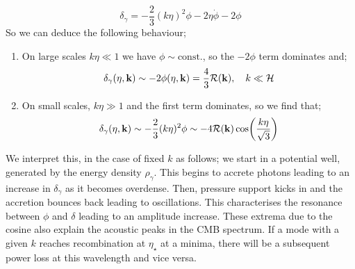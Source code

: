 \begin{equation*}
\delta_\gamma = -\frac{2}{3}(k\eta)^2 \phi - 2\eta \dot{\phi} - 2\phi
\end{equation*}
So we can deduce the following behaviour;
\begin{enumerate}
\item On large scales $k\eta \ll 1$ we have $\phi \sim \text{const.}$, so the $-2\phi$ term dominates and;
\begin{equation}
\delta_{\gamma}(\eta, \mathbf{k}) \sim -2\phi(\eta, \mathbf{k}) = \frac{4}{3}\mathcal{R}(\mathbf{k}), \quad k \ll \mathcal{H}
\end{equation}
\item On small scales, $k\eta \gg 1$ and the first term dominates, so we find that;
\begin{equation}
\delta_{\gamma}(\eta, \vec{k}) \sim -\frac{2}{3}(k\eta)^2 \phi \sim -4\mR(\vec{k})\cos\left(\frac{k\eta}{\sqrt{3}}\right)
\end{equation}
\end{enumerate}
We interpret this, in the case of fixed $k$ as follows; we start in a potential well, generated by the energy density $\rho_\gamma$. This begins to accrete photons leading to an increase in $\delta_\gamma$ as it becomes overdense. Then, pressure support kicks in and the accretion bounces back leading to oscillations. This characterises the resonance between $\phi$ and $\delta$ leading to an amplitude increase. These extrema due to the cosine also explain the acoustic peaks in the CMB spectrum. If a mode with a given $k$ reaches recombination at $\eta_{\star}$ at a minima, there will be a subsequent power loss at this wavelength and vice versa.
